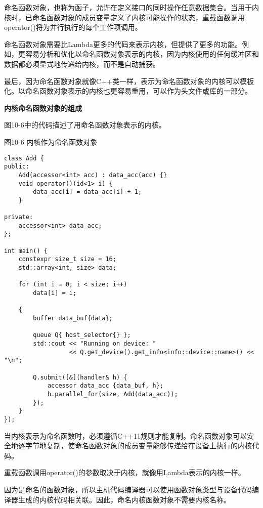 命名函数对象，也称为函子，允许在定义接口的同时操作任意数据集合。当用于内核时，已命名函数对象的成员变量定义了内核可能操作的状态，重载函数调用operator()将为并行执行的每个工作项调用。\par

命名函数对象需要比Lambda更多的代码来表示内核，但提供了更多的功能。例如，更容易分析和优化以命名函数对象表示的内核，因为内核使用的任何缓冲区和数据都必须显式地传递给内核，而不是自动捕获。\par

最后，因为命名函数对象就像C++类一样，表示为命名函数对象的内核可以模板化。以命名函数对象表示的内核也更容易重用，可以作为头文件或库的一部分。\par

\hspace*{\fill} \par %
\textbf{内核命名函数对象的组成}

图10-6中的代码描述了用命名函数对象表示的内核。\par

\hspace*{\fill} \par %
图10-6 内核作为命名函数对象
\begin{lstlisting}[caption={}]
class Add {
public:
	Add(accessor<int> acc) : data_acc(acc) {}
	void operator()(id<1> i) {
		data_acc[i] = data_acc[i] + 1;
	}

private:
	accessor<int> data_acc;
};

int main() {
	constexpr size_t size = 16;
	std::array<int, size> data;
	
	for (int i = 0; i < size; i++)
		data[i] = i;
		
	{
		buffer data_buf{data};
		
		queue Q{ host_selector{} };
		std::cout << "Running on device: "
				  << Q.get_device().get_info<info::device::name>() << "\n";
				  
		Q.submit([&](handler& h) {
			accessor data_acc {data_buf, h};
			h.parallel_for(size, Add(data_acc));
		});
	}
});
\end{lstlisting}

当内核表示为命名函数时，必须遵循C++11规则才能复制。命名函数对象可以安全地逐字节地复制，使命名函数对象的成员变量能够传递给在设备上执行的内核代码。\par

重载函数调用operator()的参数取决于内核，就像用Lambda表示的内核一样。\par

因为是命名的函数对象，所以主机代码编译器可以使用函数对象类型与设备代码编译器生成的内核代码相关联。因此，命名内核函数对象不需要内核名称。\par












